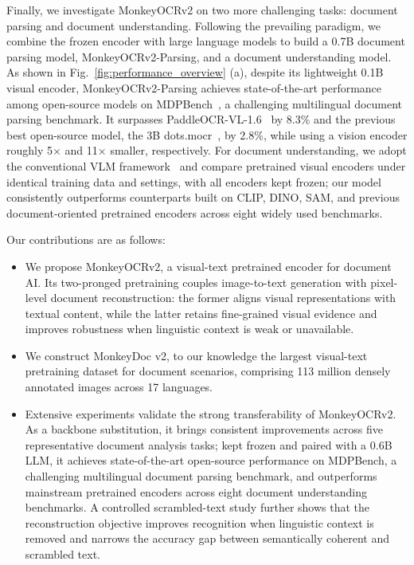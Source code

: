\documentclass{article}
\begin{document}
\begin{table}[t]
\begin{tabular}{@{}lrlc@{}}
\bottomrule
\end{tabular}
\end{table}

Finally, we investigate MonkeyOCRv2 on two more challenging tasks: document parsing and document understanding. Following the prevailing paradigm, we combine the frozen encoder with large language models to build a 0.7B document parsing model, MonkeyOCRv2-Parsing, and a document understanding model. As shown in Fig.~\ref{fig:performance_overview} (a), despite its lightweight 0.1B visual encoder, MonkeyOCRv2-Parsing achieves state-of-the-art performance among open-source models on MDPBench~\cite{mdpbench}, a challenging multilingual document parsing benchmark. It surpasses PaddleOCR-VL-1.6~\cite{ppocrvl16} by 8.3\% and the previous best open-source model, the 3B dots.mocr~\cite{dotsmocr}, by 2.8\%, while using a vision encoder roughly 5$\times$ and 11$\times$ smaller, respectively.
For document understanding, we adopt the conventional VLM framework~\cite{llava1.5} and compare pretrained visual encoders under identical training data and settings, with all encoders kept frozen; our model consistently outperforms counterparts built on CLIP, DINO, SAM, and previous document-oriented pretrained encoders across eight widely used benchmarks.

Our contributions are as follows:
\begin{itemize}
    \item We propose MonkeyOCRv2, a visual-text pretrained encoder for document AI. 
    Its two-pronged pretraining couples image-to-text generation with pixel-level document reconstruction: the former aligns visual representations with textual content, while the latter retains fine-grained visual evidence and improves robustness when linguistic context is weak or unavailable.
    \item We construct MonkeyDoc v2, to our knowledge the largest visual-text pretraining dataset for document scenarios, comprising 113 million densely annotated images across 17 languages.
    \item Extensive experiments validate the strong transferability of MonkeyOCRv2. As a backbone substitution, it brings consistent improvements across five representative document analysis tasks; kept frozen and paired with a 0.6B LLM, it achieves state-of-the-art open-source performance on MDPBench, a challenging multilingual document parsing benchmark, and outperforms mainstream pretrained encoders across eight document understanding benchmarks. 
    A controlled scrambled-text study further shows that the reconstruction objective improves recognition when linguistic context is removed and narrows the accuracy gap between semantically coherent and scrambled text.
\end{itemize}
\end{document}
